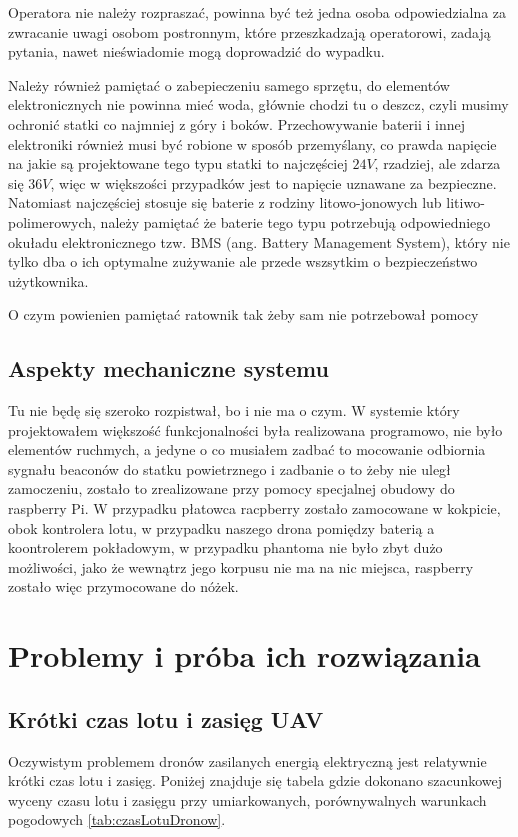 Operatora nie należy rozpraszać, powinna być też jedna osoba odpowiedzialna za zwracanie uwagi osobom postronnym, które przeszkadzają operatorowi, zadają pytania, nawet nieświadomie mogą doprowadzić do wypadku. 

Należy również pamiętać o zabepieczeniu samego sprzętu, do elementów elektronicznych nie powinna mieć woda, głównie chodzi tu o deszcz, czyli musimy ochronić statki co najmniej z góry i boków. Przechowywanie baterii i innej elektroniki również musi być robione w sposób przemyślany, co prawda napięcie na jakie są projektowane tego typu statki to najczęściej $24 V$, rzadziej, ale zdarza się $36 V$, więc w większości przypadków jest to napięcie uznawane za bezpieczne. Natomiast najczęściej stosuje się baterie z rodziny litowo-jonowych lub litiwo-polimerowych, należy pamiętać że baterie tego typu potrzebują odpowiedniego okuładu elektronicznego tzw. BMS (ang. Battery Management System), który nie tylko dba o ich optymalne zużywanie ale przede wszsytkim o bezpieczeństwo użytkownika.

O czym powienien pamiętać ratownik tak żeby sam nie potrzebował pomocy
\subsection{Aspekty mechaniczne systemu}

Tu nie będę się szeroko rozpistwał, bo i nie ma o czym. W systemie który projektowałem większość funkcjonalności była realizowana programowo, nie było elementów ruchmych, a jedyne o co musiałem zadbać to mocowanie odbiornia sygnału beaconów do statku powietrznego i zadbanie o to żeby nie uległ zamoczeniu, zostało to zrealizowane przy pomocy specjalnej obudowy do raspberry Pi. W przypadku płatowca racpberry zostało zamocowane w kokpicie, obok kontrolera lotu, w przypadku naszego drona pomiędzy baterią a koontrolerem pokładowym, w przypadku phantoma nie było zbyt dużo możliwości, jako że wewnątrz jego korpusu nie ma na nic miejsca, raspberry zostało więc przymocowane do nóżek.

\section{Problemy i próba ich rozwiązania}
\subsection{Krótki czas lotu i zasięg UAV}

Oczywistym problemem dronów zasilanych energią elektryczną jest relatywnie krótki czas lotu i zasięg. Poniżej znajduje się tabela gdzie dokonano szacunkowej wyceny czasu lotu i zasięgu przy umiarkowanych, porównywalnych warunkach pogodowych \ref{tab:czasLotuDronow}.

